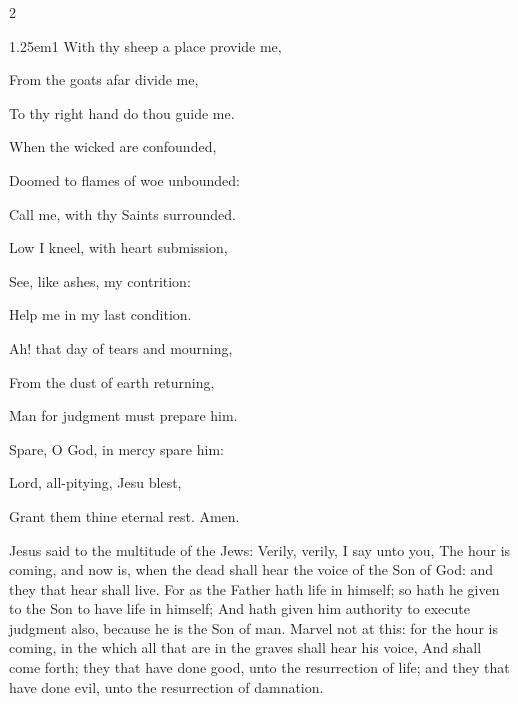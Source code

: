 \begin{multicols}{2}
\begin{hangparas}{1.25em}{1}
With thy sheep a place provide me,\par\noindent
From the goats afar divide me,\par\noindent
To thy right hand do thou guide me.\par
\vspace{0.5\baselineskip}
\par\noindent
When the wicked are confounded,\par\noindent
Doomed to flames of woe unbounded:\par\noindent
Call me, with thy Saints surrounded.\par
\vspace{0.5\baselineskip}
\par\noindent
Low I kneel, with heart submission,\par\noindent
See, like ashes, my contrition:\par\noindent
Help me in my last condition.\par
\vspace{0.5\baselineskip}
\par\noindent
Ah! that day of tears and mourning,\par\noindent
From the dust of earth returning,\par\noindent
Man for judgment must prepare him.\par
\vspace{0.5\baselineskip}
\par\noindent
Spare, O God, in mercy spare him:\par\noindent
Lord, all-pitying, Jesu blest,\par\noindent
Grant them thine eternal rest. Amen.
\end{hangparas}
\end{multicols}

 Jesus said to the multitude of the Jews: Verily, verily, I say unto you, The hour is coming, and now is, when the dead shall hear the voice of the Son of God: and they that hear shall live. For as the Father hath life in himself; so hath he given to the Son to have life in himself; And hath given him authority to execute judgment also, because he is the Son of man. Marvel not at this: for the hour is coming, in the which all that are in the graves shall hear his voice, And shall come forth; they that have done good, unto the resurrection of life; and they that have done evil, unto the resurrection of damnation.


